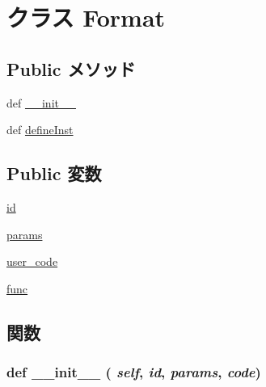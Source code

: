 \hypertarget{classisa__parser_1_1Format}{
\section{クラス Format}
\label{classisa__parser_1_1Format}
}
\subsection*{Public メソッド}
\begin{DoxyCompactItemize}
\item 
def \hyperlink{classisa__parser_1_1Format_ac775ee34451fdfa742b318538164070e}{\_\-\_\-init\_\-\_\-}
\item 
def \hyperlink{classisa__parser_1_1Format_a3e5cbc15d52ce2de63894dbe9e35135f}{defineInst}
\end{DoxyCompactItemize}
\subsection*{Public 変数}
\begin{DoxyCompactItemize}
\item 
\hyperlink{classisa__parser_1_1Format_acf2488b95c97e0378c9bf49de3b50f28}{id}
\item 
\hyperlink{classisa__parser_1_1Format_a41000f175dc0115080e2a682cc06dbe9}{params}
\item 
\hyperlink{classisa__parser_1_1Format_ab87f5ecf4c175818c347fc4998a62d23}{user\_\-code}
\item 
\hyperlink{classisa__parser_1_1Format_a3699148440db7bdde6e95e16092363d1}{func}
\end{DoxyCompactItemize}


\subsection{関数}
\hypertarget{classisa__parser_1_1Format_ac775ee34451fdfa742b318538164070e}{
\subsubsection[{\_\-\_\-init\_\-\_\-}]{\setlength{\rightskip}{0pt plus 5cm}def \_\-\_\-init\_\-\_\- ( {\em self}, \/   {\em id}, \/   {\em params}, \/   {\em code})}}
\label{classisa__parser_1_1Format_ac775ee34451fdfa742b318538164070e}



